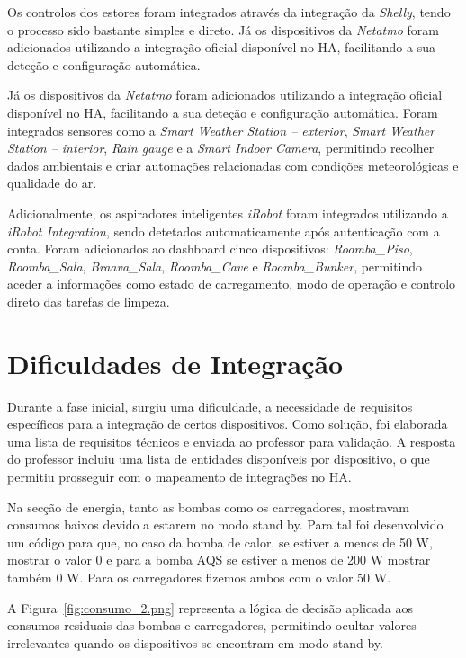 Os controlos dos estores foram integrados através da integração da \textit{Shelly}, tendo o processo sido bastante simples e direto.
Já os dispositivos da \textit{Netatmo} foram adicionados utilizando a integração oficial disponível no \gls{HA}, facilitando a sua deteção e configuração automática.

Já os dispositivos da \textit{Netatmo} foram adicionados utilizando a integração oficial disponível no \gls{HA}, facilitando a sua deteção e configuração automática. Foram integrados sensores como a \textit{Smart Weather Station – exterior}, \textit{Smart Weather Station – interior}, \textit{Rain gauge} e a \textit{Smart Indoor Camera}, permitindo recolher dados ambientais e criar automações relacionadas com condições meteorológicas e qualidade do ar.

Adicionalmente, os aspiradores inteligentes \textit{iRobot} foram integrados utilizando a \textit{iRobot Integration}, sendo detetados automaticamente após autenticação com a conta. Foram adicionados ao dashboard cinco dispositivos: \textit{Roomba\_Piso}, \textit{Roomba\_Sala}, \textit{Braava\_Sala}, \textit{Roomba\_Cave} e \textit{Roomba\_Bunker}, permitindo aceder a informações como estado de carregamento, modo de operação e controlo direto das tarefas de limpeza.


\section{Dificuldades de Integração}

Durante a fase inicial, surgiu uma dificuldade, a necessidade de requisitos específicos para a integração de certos dispositivos. Como solução, foi elaborada uma lista de requisitos técnicos e enviada ao professor para validação. A resposta do professor incluiu uma lista de entidades disponíveis por dispositivo, o que permitiu prosseguir com o mapeamento de integrações no \gls{HA}.

Na secção de energia, tanto as bombas como os carregadores, mostravam consumos baixos devido a estarem no modo stand by. Para tal foi desenvolvido um código para que, no caso da bomba de calor, se estiver a menos de 50 W, mostrar o valor 0 e para a bomba AQS se estiver a menos de 200 W mostrar também 0 W. Para os carregadores fizemos ambos com o valor 50 W.

A Figura~\ref{fig:consumo_2.png} representa a lógica de decisão aplicada aos consumos residuais das bombas e carregadores, permitindo ocultar valores irrelevantes quando os dispositivos se encontram em modo stand-by.


